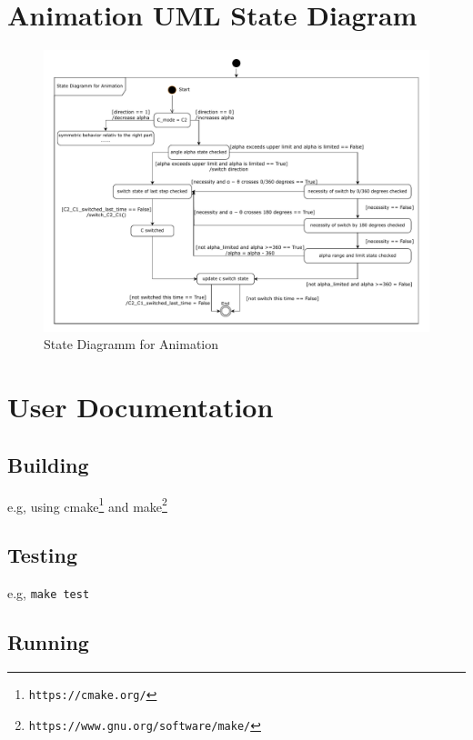 \documentclass{article}
\begin{document}
\appendix

\section{Animation UML State Diagram} \label{ap:animation}

\begin{figure}[h]
	\centering
	\includegraphics[width=\textwidth]{./figures/animation_state_diagramm_1.pdf}
	\caption{State Diagramm for Animation}
	\label{fig:state_diagramm_of_animation_alpha}
\end{figure}

\section{User Documentation} \label{ch:userdoc}

\subsection{Building}

e.g, using cmake\footnote{\tt https://cmake.org/} and make\footnote{\tt https://www.gnu.org/software/make/}


\subsection{Testing}

e.g, \verb!make test!

\subsection{Running}
\end{document}

